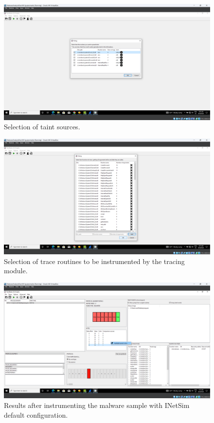 \documentclass[conference]{IEEEtran}
\begin{document}
\begin{figure}[htbp]
    \centerline{\includegraphics[width=\textwidth]{images/sch_s2.png}}
    \caption{Selection of taint sources.}
    \label{figure:ap_sch_s2}
\end{figure}

\begin{figure}[htbp]
    \centerline{\includegraphics[width=\textwidth]{images/sch_s3.png}}
    \caption{Selection of trace routines to be instrumented by the tracing module.}
    \label{figure:ap_sch_s3}
\end{figure}

\begin{figure}[htbp]
    \centerline{\includegraphics[width=\textwidth]{images/sch_s5.png}}
    \caption{Results after instrumenting the malware sample with INetSim default configuration.}
    \label{figure:ap_sch_s5}
\end{figure}
\end{document}
